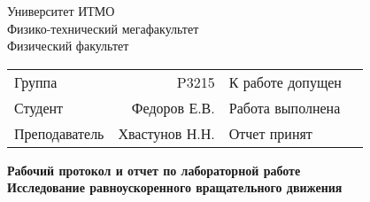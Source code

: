 \begin{titlepage}
\thispagestyle{firststyle}
\begin{center}
    Университет ИТМО \\
    Физико-технический мегафакультет \\
    Физический факультет \\
\end{center}
\vspace{1cm}
\begin{center}
    \begin{tabular}{ l r l c }
        Группа & P3215 & К работе допущен & \hspace{2cm}  \\\cline{4-4}
        Студент & Федоров Е.В. & Работа выполнена & \hspace{2cm} \\\cline{4-4}
        Преподаватель & Хвастунов Н.Н. & Отчет принят & \hspace{2cm} \\\cline{4-4}
    \end{tabular}
\end{center}

\vspace{2cm}

\begin{center}
    \Large
    \textbf{Рабочий протокол и отчет по
        лабораторной работе 
    }
    \\
    \huge
    \textbf{Исследование равноускоренного вращательного движения}
\end{center}
\end{titlepage}
